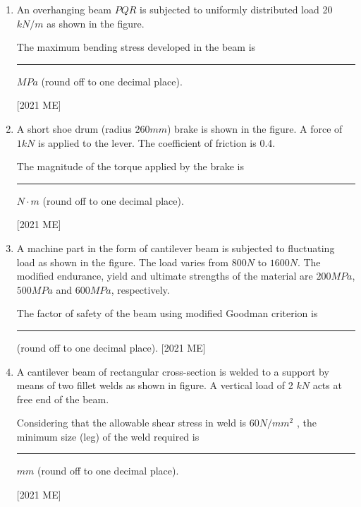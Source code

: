 \documentclass[journal]{IEEEtran}
\begin{document}
\begin{enumerate}
\hfill [2021 ME]
\item An overhanging beam $PQR$ is subjected to uniformly distributed load 20
$kN/m$ as shown in the figure. 

The maximum bending stress developed in the beam is \rule{2cm}{0.4pt} $MPa$ (round off to one decimal place).

\hfill [2021 ME]

\item A short shoe drum (radius $260 mm$) brake is shown in the figure. A force of
$1 kN$ is applied to the lever. The coefficient of friction is 0.4. 
 
The magnitude of the torque applied by the brake is \rule{2cm}{0.4pt}$N \cdot m$ (round off to one decimal place). 

\hfill [2021 ME]
\item A machine part in the form of cantilever beam is subjected to fluctuating
load as shown in the figure. The load varies from $800 N$ to $1600 N$. The
modified endurance, yield and ultimate strengths of the material are $200
MPa$, $500 MPa$ and $600 MPa$, respectively. 

The factor of safety of the beam using modified Goodman criterion is \rule{2cm}{0.4pt} (round off to one decimal place).
\hfill [2021 ME]
\item A cantilever beam of rectangular cross-section is welded to a support by
means of two fillet welds as shown in figure. A vertical load of 2 $kN$ acts at
free end of the beam. 

Considering that the allowable shear stress in weld is $60 N/mm^2$
, the
minimum size (leg) of the weld required is \rule{2cm}{0.4pt} $mm$ (round off to one
decimal place).

\hfill [2021 ME]
\end{enumerate}
\end{document}
